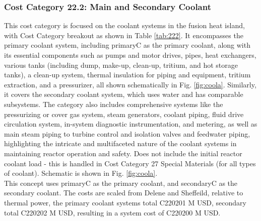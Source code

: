 
\subsubsection{Cost Category 22.2: Main and Secondary Coolant}

This cost category is focused on the coolant systems in the fusion heat island, with Cost Category breakout as shown in Table \ref{tab:222}. It encompasses the primary coolant system, including primaryC as the primary coolant, along with its essential components such as pumps and motor drives, pipes, heat exchangers, various tanks (including dump, make-up, clean-up, tritium, and hot storage tanks), a clean-up system, thermal insulation for piping and equipment, tritium extraction, and a pressurizer, all shown schematically in Fig. \ref{fig:coola}. Similarly, it covers the secondary coolant system, which uses water and has comparable subsystems.  The category also includes comprehensive systems like the pressurizing or cover gas system, steam generators, coolant piping, fluid drive circulation system, in-system diagnostic instrumentation, and metering, as well as main steam piping to turbine control and isolation valves and feedwater piping, highlighting the intricate and multifaceted nature of the coolant systems in maintaining reactor operation and safety.  Does not include the initial reactor coolant load - this is handled in  Cost Category 27 Special Materials (for all types of coolant). Schematic is shown in Fig. \ref{fig:coola}. \\




This concept uses primaryC as the primary coolant, and secondaryC as the secondary coolant. The costs are scaled from Delene and Sheffeild, relative to thermal power, the primary coolant systems total C220201 M USD, secondary total C220202 M USD, resulting in a system cost of C220200 M USD. \\


